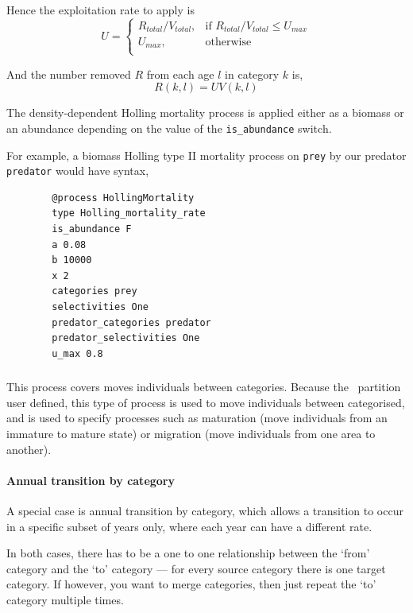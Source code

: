 Hence the exploitation rate to apply is 
\begin{equation}
	U = \begin{cases}
		R_{total}/V_{total}, & \text{if $R_{total}/V_{total} \leq U_{max}$} \\
		U_{max}, & \text{otherwise}\\ 
	\end{cases} 
\end{equation}

And the number removed $R$ from each age $l$ in category $k$ is,
\begin{equation}
	R(k,l) = UV(k,l)
\end{equation}

The density-dependent Holling mortality process is applied either as a biomass or an abundance depending on the value of the \texttt{is\_abundance} switch.

For example, a biomass Holling type II mortality process on \texttt{prey} by our predator \texttt{predator} would have syntax,

{\small{\begin{verbatim}
		@process HollingMortality
		type Holling_mortality_rate
		is_abundance F
		a 0.08
		b 10000
		x 2
		categories prey
		selectivities One
		predator_categories predator
		predator_selectivities One
		u_max 0.8
		\end{verbatim}}}

\subsubsection{}

This process covers moves individuals between categories. Because the \CNAME\ partition user defined, this type of process is used to move individuals between categorised, and is used to specify processes such as maturation (move individuals from an immature to mature state) or migration (move individuals from one area to another). 

\paragraph{Annual transition by category}

A special case is annual transition by category, which allows a transition to occur in a specific subset of years only, where each year can have a different rate.

In both cases, there has to be a one to one relationship between the `from' category and the `to' category --- for every source category there is one target category. If however, you want to merge categories, then just repeat the `to' category multiple times. 

